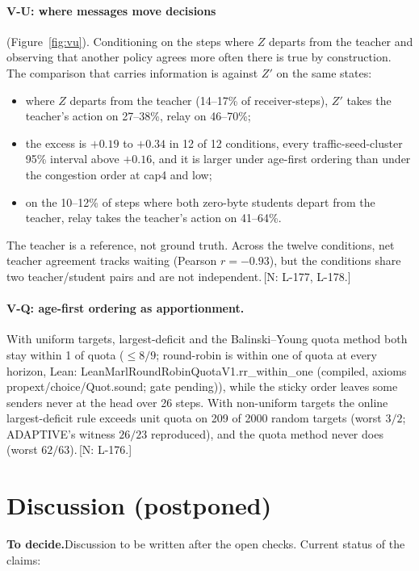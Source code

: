 \documentclass[11pt]{article}
\theoremstyle{definition}
\newif\ifshownotes\shownotestrue
\newcommand{\NOTE}[1]{\ifshownotes{\color{notecol}\,\textsf{\footnotesize[N: #1]}}\fi}
\newcommand{\TODOPAR}[1]{\ifshownotes\par\vspace{2pt}\noindent%
  {\color{todocol}\textsf{\footnotesize\textbf{To decide.}\;#1}}\par\vspace{2pt}\fi}
\newcommand{\LEANC}[1]{\textsf{\footnotesize Lean: #1 (compiled, axioms propext/choice/Quot.sound; gate pending)}}
\begin{document}
\paragraph{V-U: where messages move decisions} (Figure~\ref{fig:vu}). Conditioning on the steps where $Z$ departs from the
teacher and observing that another policy agrees more often there is true by construction. The comparison that carries
information is against $Z'$ on the same states:
\begin{itemize}
\item where $Z$ departs from the teacher (14--17\% of receiver-steps), $Z'$ takes the teacher's action on 27--38\%, relay on
46--70\%;
\item the excess is $+0.19$ to $+0.34$ in 12 of 12 conditions, every traffic-seed-cluster 95\% interval above $+0.16$, and it is
larger under age-first ordering than under the congestion order at cap4 and low;
\item on the 10--12\% of steps where both zero-byte students depart from the teacher, relay takes the teacher's action on
41--64\%.
\end{itemize}
The teacher is a reference, not ground truth. Across the twelve conditions, net teacher agreement tracks waiting (Pearson
$r=-0.93$), but the conditions share two teacher/student pairs and are not independent.\NOTE{L-177, L-178.}
\paragraph{V-Q: age-first ordering as apportionment.} With uniform targets, largest-deficit and the Balinski--Young quota
method both stay within 1 of quota ($\le8/9$; round-robin is within one of quota at every horizon,
\LEANC{LeanMarlRoundRobinQuotaV1.rr\_within\_one}), while the sticky order leaves some senders never at the head over 26
steps.
With non-uniform targets the online largest-deficit rule exceeds unit quota on 209 of 2000 random targets (worst $3/2$;
ADAPTIVE's witness $26/23$ reproduced), and the quota method never does (worst $62/63$).\NOTE{L-176.}

\section{Discussion (postponed)}\label{sec:disc}
\TODOPAR{Discussion to be written after the open checks. Current status of the claims:}
\end{document}
